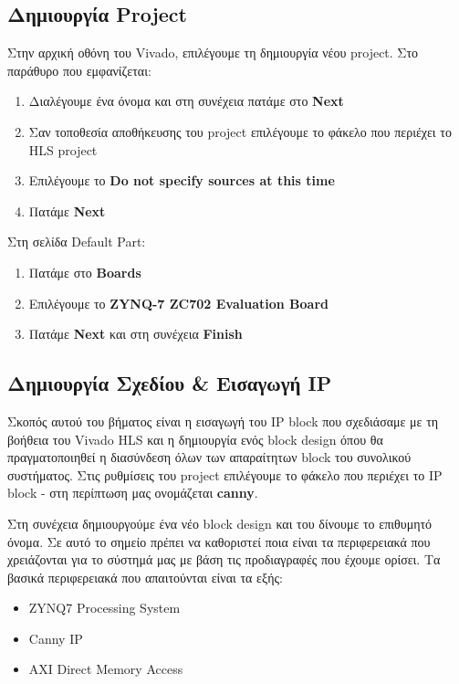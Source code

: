 \subsection{Δημιουργία Project}

Στην αρχική οθόνη του Vivado, επιλέγουμε τη δημιουργία νέου project. Στο παράθυρο που εμφανίζεται:
\begin{enumerate}[label=(\alph*)]
\item {Διαλέγουμε ένα όνομα και στη συνέχεια πατάμε στο \textbf{Next}}
\item {Σαν τοποθεσία αποθήκευσης του project επιλέγουμε το φάκελο που περιέχει το HLS project}
\item {Επιλέγουμε το \textbf{Do not specify sources at this time}}
\item {Πατάμε \textbf{Next}} \\
\end{enumerate}
Στη σελίδα Default Part:
\begin{enumerate}[label=(\alph*)]
\item {Πατάμε στο \textbf{Boards}}
\item {Επιλέγουμε το \textbf{ZYNQ-7 ZC702 Evaluation Board}}
\item {Πατάμε \textbf{Next} και στη συνέχεια \textbf{Finish}}
\end{enumerate}

\subsection{Δημιουργία Σχεδίου \& Εισαγωγή IP}

Σκοπός αυτού του βήματος είναι η εισαγωγή του IP block που σχεδιάσαμε με τη βοήθεια του Vivado HLS και η δημιουργία ενός block design όπου θα πραγματοποιηθεί η διασύνδεση όλων των απαραίτητων block του συνολικού συστήματος. Στις ρυθμίσεις του project επιλέγουμε το φάκελο που περιέχει το IP block - στη περίπτωση μας ονομάζεται \textbf{canny}.

Στη συνέχεια δημιουργούμε ένα νέο block design και του δίνουμε το επιθυμητό όνομα. Σε αυτό το σημείο πρέπει να καθοριστεί ποια είναι τα περιφερειακά που χρειάζονται για το σύστημά μας με βάση τις προδιαγραφές που έχουμε ορίσει. Τα βασικά περιφερειακά που απαιτούνται είναι τα εξής:
\begin{itemize}
	\item{ZYNQ7 Processing System}
	\item{Canny IP}
	\item{AXI Direct Memory Access} \\
\end{itemize}

